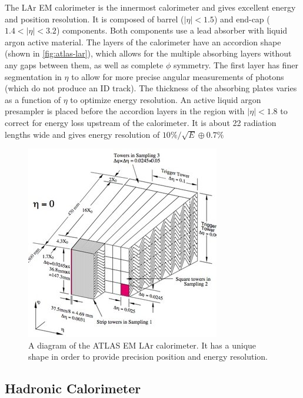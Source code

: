 The \ac{LAr} \ac{EM} calorimeter is the innermost calorimeter and gives excellent energy and position resolution. \cite{calorimeters} It is composed of barrel ($|\eta| < 1.5$) and end-cap ($1.4 < |\eta| < 3.2$) components. Both components use a lead absorber with liquid argon active material. The layers of the calorimeter have an accordion shape (shown in \autoref{fig:atlas-lar}), which allows for the multiple absorbing layers without any gaps between them, as well as complete $\phi$ symmetry. The first layer has finer segmentation in $\eta$ to allow for more precise angular measurements of photons (which do not produce an \ac{ID} track). The thickness of the absorbing plates varies as a function of $\eta$ to optimize energy resolution. An active liquid argon presampler is placed before the accordion layers in the region with $|\eta| < 1.8$ to correct for energy loss upstream of the calorimeter. It is about 22 radiation lengths wide and gives energy resolution of $10\%/\sqrt{E} \oplus 0.7\%$

\begin{figure}[htbp]
\centering
\includegraphics[width=.6\textwidth]{figures/Detector/lar.jpg}
\caption{A diagram of the \ac{ATLAS} \ac{EM} \ac{LAr} calorimeter. It has a unique shape in order to provide precision position and energy resolution.}
\label{fig:atlas-lar}
\end{figure}


\subsection{Hadronic Calorimeter}

